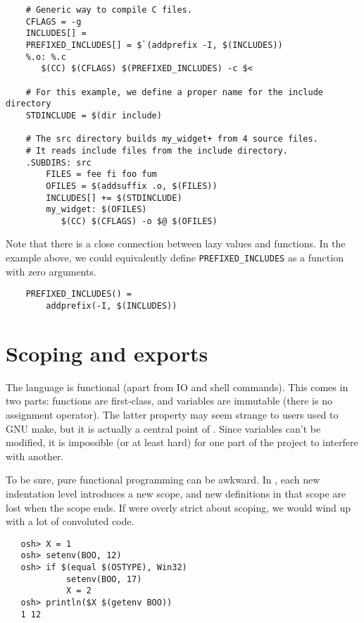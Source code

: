 \begin{verbatim}
    # Generic way to compile C files.
    CFLAGS = -g
    INCLUDES[] =
    PREFIXED_INCLUDES[] = $`(addprefix -I, $(INCLUDES))
    %.o: %.c
       $(CC) $(CFLAGS) $(PREFIXED_INCLUDES) -c $<

    # For this example, we define a proper name for the include directory
    STDINCLUDE = $(dir include)

    # The src directory builds my_widget+ from 4 source files.
    # It reads include files from the include directory.
    .SUBDIRS: src
        FILES = fee fi foo fum
        OFILES = $(addsuffix .o, $(FILES))
        INCLUDES[] += $(STDINCLUDE)
        my_widget: $(OFILES)
           $(CC) $(CFLAGS) -o $@ $(OFILES)
\end{verbatim}

Note that there is a close connection between lazy values and functions.  In the example above, we
could equivalently define \verb+PREFIXED_INCLUDES+ as a function with zero arguments.

\begin{verbatim}
    PREFIXED_INCLUDES() =
        addprefix(-I, $(INCLUDES))
\end{verbatim}

\section{Scoping and exports}

The \OMake{} language is functional (apart from IO and shell commands).  This comes in two parts:
functions are first-class, and variables are immutable (there is no assignment operator).  The
latter property may seem strange to users used to GNU make, but it is actually a central point of
\OMake{}.  Since variables can't be modified, it is impossible (or at least hard) for one part of the
project to interfere with another.

To be sure, pure functional programming can be awkward.  In \OMake{}, each new indentation level
introduces a new scope, and new definitions in that scope are lost when the scope ends.  If \OMake{}
were overly strict about scoping, we would wind up with a lot of convoluted code.

\begin{verbatim}
   osh> X = 1
   osh> setenv(BOO, 12)
   osh> if $(equal $(OSTYPE), Win32)
            setenv(BOO, 17)
            X = 2
   osh> println($X $(getenv BOO))
   1 12
\end{verbatim}

